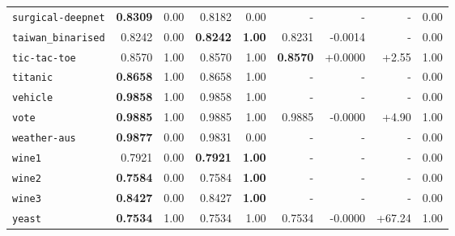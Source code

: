 \begin{tabular}{lrrrrrrrr}
\texttt{surgical-deepnet} & \textbf{0.8309} & 0.00 & 0.8182 & 0.00 & - & - & - & 0.00\\
\texttt{taiwan\_binarised} & 0.8242 & 0.00 & \textbf{0.8242} & \textbf{1.00} & 0.8231 & -0.0014 & - & 0.00\\
\texttt{tic-tac-toe} & 0.8570 & 1.00 & 0.8570 & 1.00 & \textbf{0.8570} & +0.0000 & +2.55 & 1.00\\
\texttt{titanic} & \textbf{0.8658} & 1.00 & 0.8658 & 1.00 & - & - & - & 0.00\\
\texttt{vehicle} & \textbf{0.9858} & 1.00 & 0.9858 & 1.00 & - & - & - & 0.00\\
\texttt{vote} & \textbf{0.9885} & 1.00 & 0.9885 & 1.00 & 0.9885 & -0.0000 & +4.90 & 1.00\\
\texttt{weather-aus} & \textbf{0.9877} & 0.00 & 0.9831 & 0.00 & - & - & - & 0.00\\
\texttt{wine1} & 0.7921 & 0.00 & \textbf{0.7921} & \textbf{1.00} & - & - & - & 0.00\\
\texttt{wine2} & \textbf{0.7584} & 0.00 & 0.7584 & \textbf{1.00} & - & - & - & 0.00\\
\texttt{wine3} & \textbf{0.8427} & 0.00 & 0.8427 & \textbf{1.00} & - & - & - & 0.00\\
\texttt{yeast} & \textbf{0.7534} & 1.00 & 0.7534 & 1.00 & 0.7534 & -0.0000 & +67.24 & 1.00\\
\bottomrule
\end{tabular}
